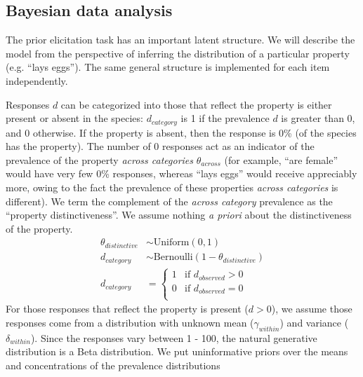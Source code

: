 \documentclass[10pt,letterpaper]{article}
\begin{document}
\subsection{Bayesian data analysis}
\label{sec:bda1}

The prior elicitation task has an important latent structure. 
We will describe the model from the perspective of inferring the distribution of a particular property (e.g. ``lays eggs''). 
The same general structure is implemented for each item independently. 

Responses $d$ can be categorized into those that reflect the property is either present or absent in the species: $d_{category}$ is 1 if the prevalence $d$ is greater than 0, and 0 otherwise. 
If the property is absent, then the response is 0\% (of the species has the property). 
The number of 0 responses act as an indicator of the prevalence of the property \emph{across categories} $\theta_{across}$ (for example, ``are female'' would have very few 0\% responses, whereas ``lays eggs'' would receive appreciably more, owing to the fact the prevalence of these properties \emph{across categories} is different).
We term the complement of the \emph{across category} prevalence as the ``property distinctiveness''.  We assume nothing \emph{a priori} about the distinctiveness of the property. 
%
\begin{align*}
\theta_{distinctive} & \sim \text{Uniform}(0,1) \\
d_{category} & \sim \text{Bernoulli}(1 - \theta_{distinctive}) \\
d_{category} & = \begin{cases}
				1 & \mbox{if } d_{observed} > 0 \\
				0 & \mbox{if } d_{observed} = 0 \\
				\end{cases}
\end{align*}
%
For those responses that reflect the property is present ($d > 0$), we assume those responses come from a distribution with unknown mean ($\gamma_{within}$) and variance ($\delta_{within}$). 
Since the responses vary between 1 - 100, the natural generative distribution is a Beta distribution. We put uninformative priors over the means and concentrations of the prevalence distributions
\end{document}
